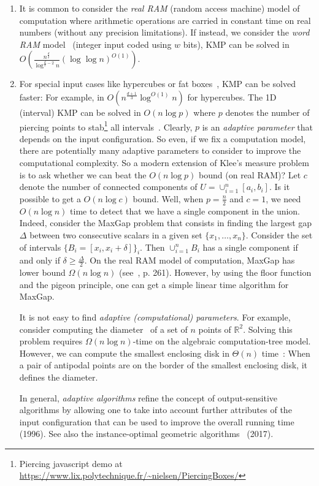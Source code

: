 \documentclass[11pt]{article}
\def\bbR{\mathbb{R}}
\begin{document}
\begin{enumerate}
\item It is common to consider the {\em real RAM}  (random access machine) model of computation where arithmetic operations are carried in constant time on real numbers (without any precision limitations).
If instead, we consider the  {\em word RAM} model~\cite{ChanKlee-2013} (integer input coded using $w$ bits), KMP can be solved in
$O\left(\frac{n^{\frac{d}{2}}}{\log^{\frac{d}{2}-2} n} (\log\log n)^{O(1)}\right)$.


\item For special input cases like hypercubes or fat boxes~\cite{ChanKlee-2013}, KMP can be solved faster: For example, in $O(n^{\frac{d+1}{3}}\log^{O(1)} n)$ for hypercubes. 
The 1D (interval) KMP can be solved in $O(n\log p)$ where $p$ denotes the number of piercing points to stab\footnote{Piercing javascript demo at \url{https://www.lix.polytechnique.fr/~nielsen/PiercingBoxes/}} all intervals~\cite{nielsen-2000}.
Clearly, $p$ is an {\em adaptive parameter} that depends on the input configuration. 
So even, if we fix a computation model, there are potentially many adaptive parameters to consider to improve the computational complexity.
So a modern extension of Klee's measure problem is to ask whether we can beat the $O(n\log p)$ bound (on real RAM)?
Let $c$ denote the number of connected components of $U=\cup_{i=1}^n [a_i,b_i]$. Is it possible to get a 
$O(n\log c)$ bound. Well, when $p=\frac{n}{2}$ and $c=1$, we need $O(n\log n)$ time to detect that we have a single component in the union.
Indeed, consider the {\sc MaxGap} problem that consists in finding the largest gap $\Delta$ between two consecutive scalars in a given set $\{x_1,\ldots, x_n\}$. Consider the set of intervals $\{B_i=[x_i,x_i+\delta]\}_i$. 
Then $\cup_{i=1}^n B_i$ has a single component if and only if $\delta\geq\frac{\Delta}{2}$.
On the real RAM model of computation, {\sc MaxGap} has lower bound $\Omega(n\log n)$ (see~\cite{PS-1988}, p. 261).
However, by using the floor function and the pigeon principle, one can get a simple linear time algorithm for {\sc MaxGap}.

It is not easy to find {\em adaptive (computational) parameters}.
For example, consider computing the diameter~\cite{malandain-2002} of a set of $n$ points of $\bbR^2$.
Solving this problem requires $\Omega(n\log n)$-time on the algebraic computation-tree model.
However, we can compute the smallest enclosing disk in $\Theta(n)$ time~\cite{megiddo-1983}: 
When a pair of antipodal points are on the border of the smallest enclosing disk, it defines the diameter.

In general, {\em adaptive algorithms} refine the concept of output-sensitive algorithms by allowing one to take into account further attributes of the input configuration that can be used to improve the overall running time~\cite{n-aga-1996} (1996).
See also the instance-optimal geometric algorithms~\cite{afshani-2017} (2017).

\end{enumerate}



\end{document}
